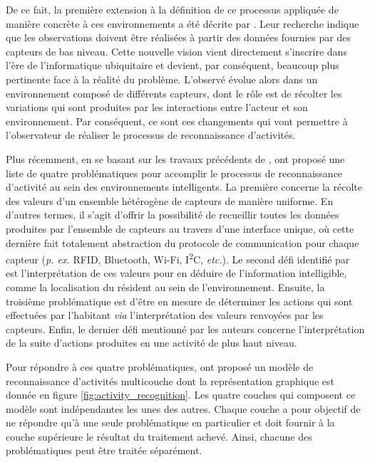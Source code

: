 {{De ce fait, la première extension à la définition de ce processus appliquée de manière concrète à ces environnements a été décrite par \cite{Patterson2005}. Leur recherche indique que les observations doivent être réalisées à partir des données fournies par des capteurs de bas niveau. Cette nouvelle vision vient directement s'inscrire dans l'ère de l'informatique ubiquitaire \citep{Weiser1991} et devient, par conséquent, beaucoup plus pertinente face à la réalité du problème. L'observé évolue alors dans un environnement composé de différents capteurs, dont le rôle est de récolter les variations qui sont produites par les interactions entre l'acteur et son environnement. Par conséquent, ce sont ces changements qui vont permettre à l'observateur de réaliser le processus de reconnaissance d'activités.

Plus récemment, en se basant sur les travaux précédents de \cite{Patterson2005}, \cite{Roy2013} ont proposé une liste de quatre problématiques pour accomplir le processus de reconnaissance d'activité au sein des environnements intelligents. La première concerne la récolte des valeurs d'un ensemble hétérogène de capteurs de manière uniforme. En d'autres termes, il s'agit d'offrir la possibilité de recueillir toutes les données produites par l'ensemble de capteurs au travers d'une interface unique, où cette dernière fait totalement abstraction du protocole de communication pour chaque capteur (\textit{p. ex.} RFID, Bluetooth, Wi-Fi, I\textsuperscript{2}C, \textit{etc.}). Le second défi identifié par \cite{Roy2013} est l'interprétation de ces valeurs pour en déduire de l'information intelligible, comme la localisation du résident au sein de l'environnement. Ensuite, la troisième problématique est d'être en mesure de déterminer les actions qui sont effectuées par l'habitant \textit{via} l'interprétation des valeurs renvoyées par les capteurs. Enfin, le dernier défi mentionné par les auteurs concerne l'interprétation de la suite d’actions produites en une activité de plus haut niveau.

Pour répondre à ces quatre problématiques, \cite{Roy2013} ont proposé un modèle de reconnaissance d'activités multicouche dont la représentation graphique est donnée en figure \ref{fig:activity_recognition}. Les quatre couches qui composent ce modèle sont indépendantes les unes des autres. Chaque couche a pour objectif de ne répondre qu'à une seule problématique en particulier et doit fournir à la couche supérieure le résultat du traitement achevé. Ainsi, chacune des problématiques peut être traitée séparément.

}}
